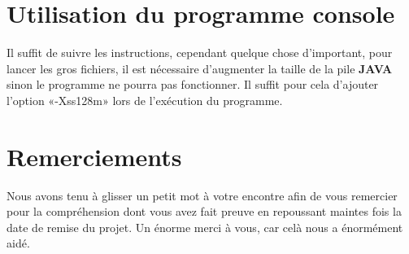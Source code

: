 \documentclass{article}
\begin{document}
\section{Utilisation du programme console}

Il suffit de suivre les instructions, cependant quelque chose d'important, pour lancer les gros fichiers, il est nécessaire d'augmenter la taille de la pile \textbf{JAVA} sinon le 
programme ne pourra pas fonctionner. Il suffit pour cela d'ajouter l'option «-Xss128m» lors de l'exécution du programme.

\section{Remerciements}

Nous avons tenu à glisser un petit mot à votre encontre afin de vous remercier pour la compréhension dont vous avez fait preuve en repoussant maintes fois la date de remise du 
projet. Un énorme merci à vous, car celà nous a énormément aidé.
\end{document}
